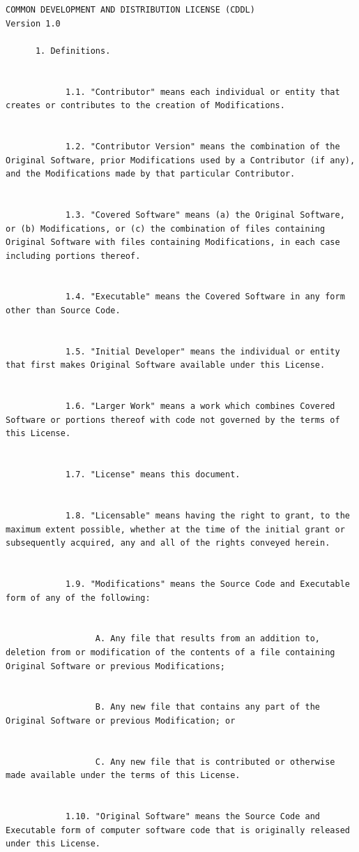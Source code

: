 \documentclass[10pt, headsepline,DIV14,BCOR0.5cm]{scrreprt}
\begin{document}
\begin{lstlisting}
COMMON DEVELOPMENT AND DISTRIBUTION LICENSE (CDDL)
Version 1.0

      1. Definitions.
     

            1.1. "Contributor" means each individual or entity that creates or contributes to the creation of Modifications.
            

            1.2. "Contributor Version" means the combination of the Original Software, prior Modifications used by a Contributor (if any), and the Modifications made by that particular Contributor.
            

            1.3. "Covered Software" means (a) the Original Software, or (b) Modifications, or (c) the combination of files containing Original Software with files containing Modifications, in each case including portions thereof.
            

            1.4. "Executable" means the Covered Software in any form other than Source Code.
            

            1.5. "Initial Developer" means the individual or entity that first makes Original Software available under this License.
            

            1.6. "Larger Work" means a work which combines Covered Software or portions thereof with code not governed by the terms of this License.
            

            1.7. "License" means this document.
            

            1.8. "Licensable" means having the right to grant, to the maximum extent possible, whether at the time of the initial grant or subsequently acquired, any and all of the rights conveyed herein.
            

            1.9. "Modifications" means the Source Code and Executable form of any of the following:
                  

                  A. Any file that results from an addition to, deletion from or modification of the contents of a file containing Original Software or previous Modifications;
                  

                  B. Any new file that contains any part of the Original Software or previous Modification; or
                  

                  C. Any new file that is contributed or otherwise made available under the terms of this License.
            

            1.10. "Original Software" means the Source Code and Executable form of computer software code that is originally released under this License.
            


\end{lstlisting}
\end{document}
